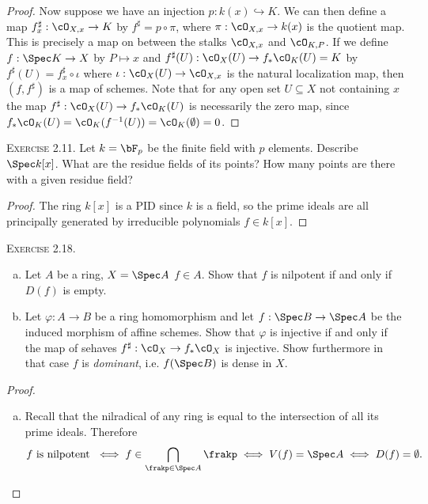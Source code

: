 \begin{problemset}
\begin{proof}
		Now suppose we have an injection $p:k(x) \hookrightarrow K$. We can then define a map $f^\sharp_x:\cO_{X,x}\to K$ by $f^{\sharp} = p\circ \pi$, where $\pi:\cO_{X,x}\to k(x)$ is the quotient map. This is precisely a map on between the stalks $\cO_{X,x}$ and $\cO_{K,P}$. If we define $f:\Spec K\to X$ by $P\mapsto x$ and $f^\sharp(U):\cO_X(U) \to f_*\cO_K(U) = K$ by $f^\sharp(U) = f^{\sharp}_x \circ \iota$ where $\iota:\cO_X(U) \to \cO_{X,x}$ is the natural localization map, then $(f,f^\sharp)$ is a map of schemes. Note that for any open set $U \subseteq X$ not containing $x$ the map $f^\sharp:\cO_X(U)\to f_*\cO_K(U)$ is necessarily the zero map, since $f_*\cO_K(U) = \cO_K(f^{-1}(U)) = \cO_K(\emptyset) = 0$.
	\end{proof}
	\item[\textsc{Exercise 2.11.}] Let $k = \bF_p$ be the finite field with $p$ elements. Describe $\Spec k[x]$. What are the residue fields of its points? How many points are there with a given residue field?
	\begin{proof}
		The ring $k[x]$ is a PID since $k$ is a field, so the prime ideals are all principally generated by irreducible polynomials $f \in k[x]$.
	\end{proof}
	\item[\textsc{Exercise 2.18.}]$ $
	\begin{enumerate}[(a)]
		\item Let $A$ be a ring, $X = \Spec A$ $f \in A$. Show that $f$ is nilpotent if and only if $D(f)$ is empty.
		\item Let $\varphi:A\to B$ be a ring homomorphism and let $f:\Spec B\to \Spec A$ be the induced morphism of affine schemes. Show that $\varphi$ is injective if and only if the map of sehaves $f^\sharp:\cO_X \to f_*\cO_X$ is injective. Show furthermore in that case $f$ is \emph{dominant}, i.e. $f(\Spec B)$ is dense in $X$.
	\end{enumerate}
	\begin{proof}
		\begin{enumerate}[(a)]
			\item Recall that the nilradical of any ring is equal to the intersection of all its prime ideals. Therefore
				\begin{align*}
					f \text{ is nilpotent } \iff f \in \bigcap_{\frakp \in \Spec A} \frakp \iff V(f) = \Spec A \iff D(f) = \emptyset.
				\end{align*}

\end{enumerate}
\end{proof}
\end{problemset}
